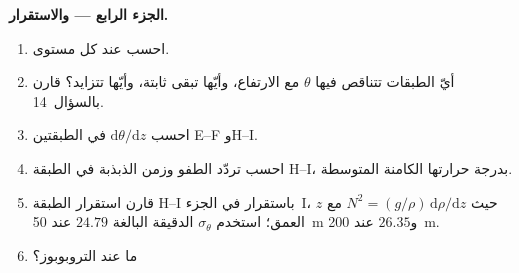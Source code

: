 \begin{problem}
\noindent\textbf{الجزء الرابع ---  والاستقرار.}
\begin{enumerate}[resume]
  \item احسب  عند كل مستوى.
  \item أيّ الطبقات تتناقص فيها $\theta$ مع الارتفاع، وأيّها تبقى ثابتة، وأيّها تتزايد؟ قارن بالسؤال~14.
  \item احسب $\mathrm d\theta/\mathrm dz$ في الطبقتين E--F وH--I.
  \item احسب تردّد الطفو وزمن الذبذبة في الطبقة H--I، بدرجة حرارتها الكامنة المتوسطة.
  \item قارن استقرار الطبقة H--I باستقرار  في الجزء~I، حيث $N^2 = (g/\rho)\,\mathrm d\rho/\mathrm dz$ مع $z$ العمق؛ استخدم $\sigma_\theta$ الدقيقة البالغة $24.79$ عند \qty{50}{m} و$26.35$ عند \qty{200}{m}.
  \item ما  عند التروبوبوز؟
\end{enumerate}
\end{problem}
